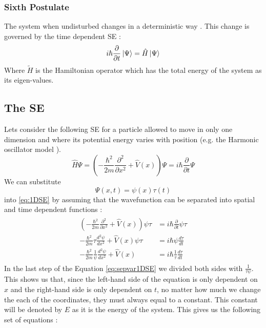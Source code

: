 \documentclass[../master_thesis.tex]{subfiles}
\begin{document}
\subsubsection{Sixth Postulate}
The system when undisturbed changes in a deterministic way \cite{Cohen:1973}.
This change is governed by the time dependent \ac{SE} \cite{Cohen:1973, Atkins:2011}:
\begin{equation}\label{eq:tdepSE}
  i\hbar\frac{\partial}{\partial t} \ket{\Psi} = \hat{H}\ket{\Psi}
\end{equation}
Where $\tilde{H}$ is the Hamiltonian operator which has the total energy of the
system as its eigen-values.

\subsection{The \ac{SE}}
Lets consider the following \ac{SE} for a particle allowed to move in only one dimension
and where its potential energy varies with position (e.g. the Harmonic oscillator
model \cite{Cohen:1973, Atkins:2014}).
\begin{equation}
  \hat{H}\Psi = \left(-\frac{\hbar^2}{2m}\frac{\partial^2 }{\partial x^2} + \hat{V}(x)\right)\Psi = i\hbar\frac{\partial}{\partial t} \Psi\label{eq:1DSE}
\end{equation}
We can substitute $$\Psi(x, t)=\psi(x)\tau(t)$$ into \ref{eq:1DSE}
by assuming that the wavefunction can be separated into spatial and time dependent
functions \cite{Atkins:2011}:
\begin{align}
  \begin{split}\label{eq:sepvar1DSE}
    \left(-\frac{\hbar^2}{2m}\frac{\partial^2 }{\partial x^2} + \hat{V}(x)\right)\psi\tau &= i\hbar\frac{\partial}{\partial t} \psi\tau \\
    -\frac{\hbar^2}{2m}\tau\frac{d^2 \psi}{d x^2} + \hat{V}(x)\psi\tau &= i\hbar\psi\frac{d\tau}{d t}\\
    -\frac{\hbar^2}{2m}\frac{1}{\psi}\frac{d^2\psi }{d x^2} + \hat{V}(x) &= i\hbar\frac{1}{\tau}\frac{d\tau}{d t}
  \end{split}
\end{align}
In the last step of the Equation \ref{eq:sepvar1DSE} we divided both sides with $\frac{1}{\tau\psi}$.
This shows us that, since the left-hand side of the equation is only dependent on $x$ and the right-hand
side is only dependent on $t$, no matter how much we change the each of the coordinates, they must always equal to
a constant. This constant will be denoted by $E$ as it is the energy of the system. This gives us the following set of equations \cite{Atkins:2011}:
\end{document}
